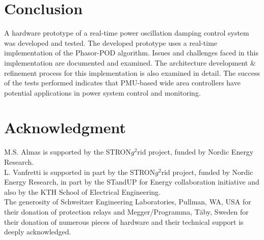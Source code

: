 \documentclass[conference]{IEEEtran}
\begin{document}
\section{Conclusion} \label{conclusion}
A hardware prototype of a real-time power oscillation damping control system was developed and tested. The developed prototype uses a real-time implementation of the Phasor-POD algorithm. Issues and challenges faced in this implementation are documented and examined. The architecture development \& refinement process for this implementation is also examined in detail. The success of the tests performed indicates that PMU-based wide area controllers have potential applications in power system control and monitoring.





\section*{Acknowledgment}


M.S. Almas is supported by the STRON$g^{2}$rid project, funded by Nordic Energy Research.\\
L. Vanfretti is supported in part by the STRON$g^{2}$rid project, funded by Nordic Energy Research, in part by the STandUP for Energy collaboration initiative and also by the KTH School of Electrical Engineering.\\
The generosity of Schweitzer Engineering Laboratories, Pullman, WA, USA for their donation of protection relays and Megger/Programma, T\"{a}by, Sweden for their donation of numerous pieces of hardware and their technical support is deeply acknowledged.


\end{document}
